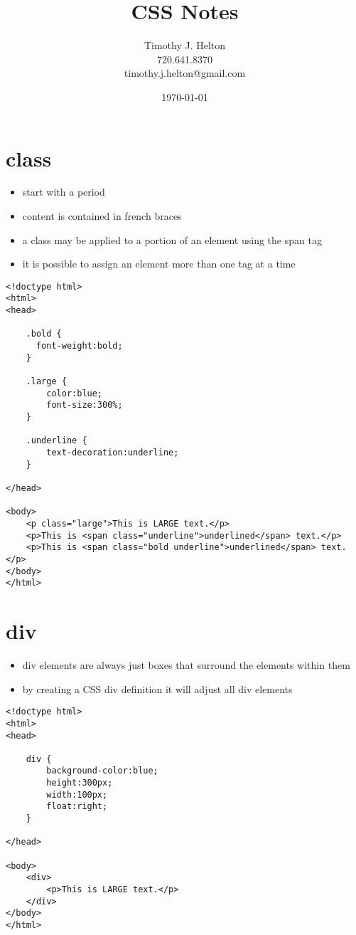 \documentclass{article}
\newcommand{\mytitle}{CSS Notes}
\begin{document}
\author{Timothy J. Helton\\720.641.8370\\timothy.j.helton@gmail.com}
\date{\today}
\title{\mytitle}

\maketitle
\newpage

\tableofcontents
\newpage

\listoffigures
\listoftables
\newpage


\section{class}
\begin{itemize}
  \item start with a period
  \item content is contained in french braces
  \item a class may be applied to a portion of an element using the span tag
  \item it is possible to assign an element more than one tag at a time
\end{itemize}
\begin{lstlisting}
<!doctype html>
<html>
<head>

    .bold {
      font-weight:bold;
    }

    .large {
        color:blue;
        font-size:300%;
    }

    .underline {
        text-decoration:underline;
    }

</head>

<body>
    <p class="large">This is LARGE text.</p>
    <p>This is <span class="underline">underlined</span> text.</p>
    <p>This is <span class="bold underline">underlined</span> text.</p>
</body>
</html>
\end{lstlisting}

\section{div}
\begin{itemize}
  \item div elements are always just boxes that surround the elements within
    them
  \item by creating a CSS div definition it will adjust all div elements
\end{itemize}
\begin{lstlisting}
<!doctype html>
<html>
<head>

    div {
        background-color:blue;
        height:300px;
        width:100px;
        float:right;
    }

</head>

<body>
    <div>
        <p>This is LARGE text.</p>
    </div>
</body>
</html>
\end{lstlisting}
\end{document}
